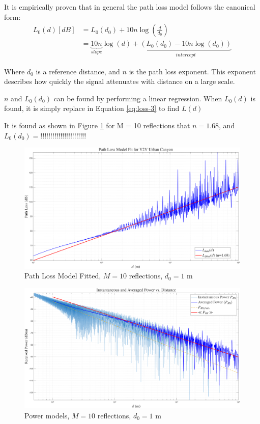 It is empirically proven that in general the path loss model follows the canonical form:
\begin{align}
	L_{0}(d) [dB] &= L_0(d_0) + 10n \log\left(\frac{d}{d_0}\right)\\
				&= \underbrace{10n}_{slope} \log(d) + \underbrace{(L_0(d_0) - 10n \log(d_0))}_{intercept} \label{eq:lin-reg}
\end{align}


Where $d_0$ is a reference distance, and $n$ is the path loss exponent. This exponent describes how quickly the signal attenuates with distance on a large scale.

$n$ and $L_0(d_0)$ can be found by performing a linear regression. When $L_0(d)$ is found, it is simply replace in Equation \ref{eq:loss-3} to find $L(d)$

It is found as shown in Figure \ref{fig:path-loss-model-fit-m10} for M = 10 reflections that $n = 1.68$, and $L_0(d_0) = !!!!!!!!!!!!!!!!!!!!!!!$
\begin{figure}[H]
	\centering
	\includegraphics[width=1\linewidth]{"content/4-images/Path Loss Model Fit M=10"}
	\caption{Path Loss Model Fitted, $M = 10$ reflections, $d_0 = 1$ m}
	\label{fig:path-loss-model-fit-m10}
\end{figure}


\begin{figure}
	\centering
	\includegraphics[width=\linewidth]{"content/4-images/Instantaneous vs average M=10"}
	\caption{Power models, $M = 10$ reflections, $d_0 = 1$ m}
	\label{fig:instantaneous-vs-average-m10}
\end{figure}







